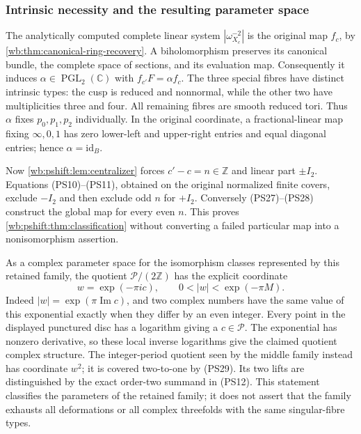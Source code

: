 \subsubsection{Intrinsic necessity and the resulting parameter space}

The analytically computed complete linear system
$|\omega_{X_c}^{-2}|$ is the original map $f_c$, by
\cref{wb:thm:canonical-ring-recovery}. A biholomorphism preserves its
canonical bundle, the complete space of sections, and its evaluation
map. Consequently it induces $\alpha\in\operatorname{PGL}_2(\mathbb C)$
with $f_{c'}F=\alpha f_c$. The three special fibres have distinct
intrinsic types: the cusp is reduced and nonnormal, while the other
two have multiplicities three and four. All remaining fibres are
smooth reduced tori. Thus $\alpha$ fixes $p_0,p_1,p_2$ individually.
In the original coordinate, a fractional-linear map fixing
$\infty,0,1$ has zero lower-left and upper-right entries and equal
diagonal entries; hence $\alpha=\mathrm{id}_B$.

Now \cref{wb:pshift:lem:centralizer} forces $c'-c=n\in\mathbb Z$
and linear part $\pm I_2$. Equations (PS10)--(PS11), obtained on
the original normalized finite covers, exclude $-I_2$ and then
exclude odd $n$ for $+I_2$. Conversely (PS27)--(PS28) construct
the global map for every even $n$. This proves
\cref{wb:pshift:thm:classification} without converting a failed
particular map into a nonisomorphism assertion.

As a complex parameter space for the isomorphism classes represented
by this retained family, the quotient $\mathcal P/(2\mathbb Z)$ has
the explicit coordinate
\[
 w=\exp(-\pi ic),\qquad 0<|w|<\exp(-\pi M).
 \tag{PS29}\label{wb:pshift:eq:parameter-disc}
\]
Indeed $|w|=\exp(\pi\operatorname{Im}c)$, and two complex numbers
have the same value of this exponential exactly when they differ
by an even integer. Every point in the displayed punctured disc
has a logarithm giving a $c\in\mathcal P$. The exponential has
nonzero derivative, so these local inverse logarithms give the
claimed quotient complex structure. The integer-period quotient
seen by the middle family instead has coordinate $w^2$; it is
covered two-to-one by (PS29). Its two lifts are distinguished by
the exact order-two summand in (PS12). This statement classifies
the parameters of the retained family; it does not assert that
the family exhausts all deformations or all complex threefolds
with the same singular-fibre types.
